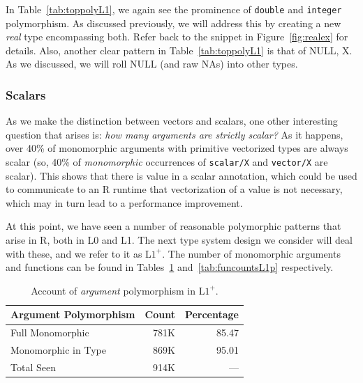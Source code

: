 \documentclass[acmsmall,10pt,review,anonymous]{acmart}\settopmatter{printfolios=true,printccs=false,printacmref=false}
\begin{document}
In Table~\ref{tab:toppolyL1}, we again see the prominence of {\tt double} and {\tt integer} polymorphism.
As discussed previously, we will address this by creating a new {\it real} type encompassing both.
Refer back to the snippet in Figure~\ref{fig:realex} for details.
Also, another clear pattern in Table~\ref{tab:toppolyL1} is that of NULL, X.
As we discussed, we will roll NULL (and raw NAs) into other types.

%
%
\subsubsection{Scalars}

As we make the distinction between vectors and scalars, one other interesting question that arises is: {\it how many arguments are strictly scalar?}
As it happens, over 40\% of monomorphic arguments with primitive vectorized types are always scalar (so, 40\% of {\it monomorphic} occurrences of {\tt scalar/X} and {\tt vector/X} are scalar).
This shows that there is value in a scalar annotation, which could be used to communicate to an R runtime that vectorization of a value is not necessary, which may in turn lead to a performance improvement.

At this point, we have seen a number of reasonable polymorphic patterns that arise in R, both in L0 and L1.
The next type system design we consider will deal with these, and we refer to it as L$1^{+}$.
The number of monomorphic arguments and functions can be found in Tables~\ref{tab:argcountsL1p} and~\ref{tab:funcountsL1p} respectively.

\begin{table}[ht]
\label{tab:argcountsL1p}
\centering
\begin{tabular}{lrr}
  \hline
 Argument Polymorphism & Count & Percentage \\
  \hline
  Full Monomorphic & 781K & 85.47 \\
  Monomorphic in Type & 869K & 95.01 \\
  Total Seen & 914K & --- \\
     \hline
\end{tabular}
\caption{Account of {\it argument} polymorphism in L$1^{+}$.}
\end{table}
\end{document}
